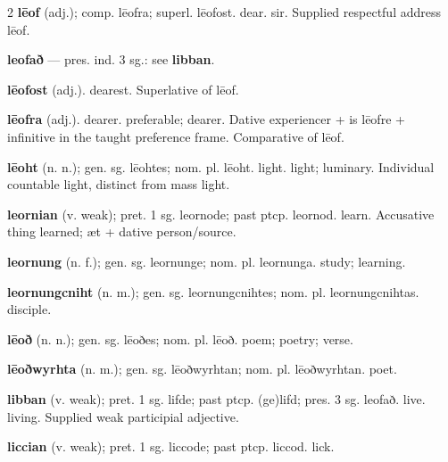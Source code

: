 \begin{multicols*}{2}
\textbf{lēof} (adj.); comp. lēofra; superl. lēofost. dear. sir. Supplied respectful address lēof.\par
\textbf{leofað} — pres. ind. 3 sg.: see \textbf{libban}.\par
\textbf{lēofost} (adj.). dearest. Superlative of lēof.\par
\textbf{lēofra} (adj.). dearer. preferable; dearer. Dative experiencer + is lēofre + infinitive in the taught preference frame. Comparative of lēof.\par
\textbf{lēoht} (n. n.); gen. sg. lēohtes; nom. pl. lēoht. light. light; luminary. Individual countable light, distinct from mass light.\par
\textbf{leornian} (v. weak); pret. 1 sg. leornode; past ptcp. leornod. learn. Accusative thing learned; æt + dative person/source.\par
\textbf{leornung} (n. f.); gen. sg. leornunge; nom. pl. leornunga. study; learning.\par
\textbf{leornungcniht} (n. m.); gen. sg. leornungcnihtes; nom. pl. leornungcnihtas. disciple.\par
\textbf{lēoð} (n. n.); gen. sg. lēoðes; nom. pl. lēoð. poem; poetry; verse.\par
\textbf{lēoðwyrhta} (n. m.); gen. sg. lēoðwyrhtan; nom. pl. lēoðwyrhtan. poet.\par
\textbf{libban} (v. weak); pret. 1 sg. lifde; past ptcp. (ge)lifd; pres. 3 sg. leofað. live. living. Supplied weak participial adjective.\par
\textbf{liccian} (v. weak); pret. 1 sg. liccode; past ptcp. liccod. lick.\par

\end{multicols*}
